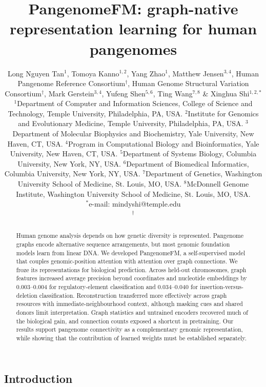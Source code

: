 \documentclass[11pt]{article}
\title{PangenomeFM: graph-native representation learning for human pangenomes}
\author{
Long Nguyen Tan$^{1}$,
Tomoya Kanno$^{1,2}$,
Yang Zhao$^{1}$,
Matthew Jensen$^{3,4}$,
Human Pangenome Reference Consortium$^{\dagger}$,
Human Genome Structural Variation Consortium$^{\dagger}$,
Mark Gerstein$^{3,4}$,
Yufeng Shen$^{5,6}$,
Ting Wang$^{7,8}$
\& Xinghua Shi$^{1,2,*}$\\[8pt]
\small $^{1}$Department of Computer and Information Sciences, College of Science and Technology, Temple University, Philadelphia, PA, USA.
\small $^{2}$Institute for Genomics and Evolutionary Medicine, Temple University, Philadelphia, PA, USA.
\small $^{3}$Department of Molecular Biophysics and Biochemistry, Yale University, New Haven, CT, USA.
\small $^{4}$Program in Computational Biology and Bioinformatics, Yale University, New Haven, CT, USA.
\small $^{5}$Department of Systems Biology, Columbia University, New York, NY, USA.
\small $^{6}$Department of Biomedical Informatics, Columbia University, New York, NY, USA.
\small $^{7}$Department of Genetics, Washington University School of Medicine, St. Louis, MO, USA.
\small $^{8}$McDonnell Genome Institute, Washington University School of Medicine, St. Louis, MO, USA.\\[3pt]
\small $^{*}$e-mail: mindyshi@temple.edu\\[3pt]
\small $^{\dagger}$\authorinput{Proposed consortium authorship; approval and member lists pending.}
}
\date{}
\makeatletter
\newcommand{\method}{PangenomeFM\xspace}
\renewcommand{\maketitle}{%
  \begin{center}
  {\LARGE\bfseries \@title\par}
  \vspace{0.55cm}
  {\normalsize \@author\par}
  \end{center}
  \vspace{0.35cm}
}
\makeatother
\begin{document}
\maketitle
\begin{bibunit}[unsrtnat]

\begin{abstract}
Human genome analysis depends on how genetic diversity is represented. Pangenome graphs encode alternative sequence arrangements, but most genomic foundation models learn from linear DNA. We developed \method, a self-supervised model that couples genomic-position attention with attention over graph connections. We froze its representations for biological prediction. Across held-out chromosomes, graph features increased average precision beyond coordinates and nucleotide embeddings by 0.003--0.004 for regulatory-element classification and 0.034--0.040 for insertion-versus-deletion classification. Reconstruction transferred more effectively across graph resources with immediate-neighbourhood context, although masking cues and shared donors limit interpretation. Graph statistics and untrained encoders recovered much of the biological gain, and connection counts exposed a shortcut in pretraining. Our results support pangenome connectivity as a complementary genomic representation, while showing that the contribution of learned weights must be established separately.
\end{abstract}

\section{Introduction}
\label{sec:intro}


\end{bibunit}
\end{document}
